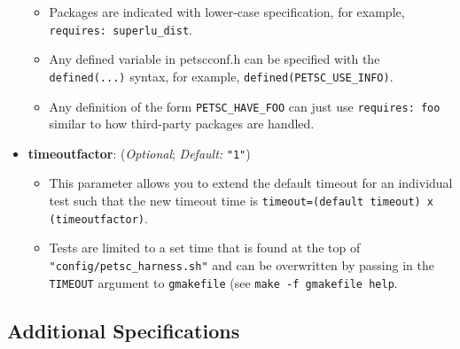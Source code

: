 \begin{itemize}
\begin{itemize}
        \item Packages are indicated with lower-case specification, for example,
        \lstinline{requires: superlu_dist}.

        \item Any defined variable in petscconf.h can be specified with the
        \lstinline{defined(...)} syntax, for example, \lstinline{defined(PETSC_USE_INFO)}.

        \item Any definition of the form \lstinline{PETSC_HAVE_FOO} can just use
        \lstinline{requires: foo} similar to how third-party packages are handled.

      \end{itemize}

    \item[]  \textbf{timeoutfactor}: (\emph{Optional}; \emph{Default:} \lstinline{"1"})
      \begin{itemize}

        \item This parameter allows you to extend the default timeout for an individual test such that the new timeout time is \lstinline{timeout=(default timeout) x (timeoutfactor)}.

        \item Tests are limited to a set time that is found at the top of \lstinline{"config/petsc_harness.sh"}
              and can be overwritten by passing in the \lstinline{TIMEOUT} argument to \lstinline{gmakefile} (see
              \lstinline{make -f gmakefile help}.

      \end{itemize}

\end{itemize}



\subsection{Additional Specifications%
  \label{additional-specifications}%
}

